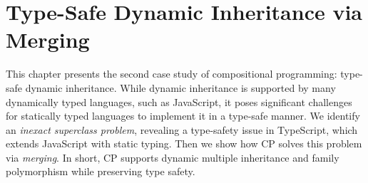 \chapter{Type-Safe Dynamic Inheritance via Merging} \label{ch:inheritance}

This chapter presents the second case study of compositional programming:
type-safe dynamic inheritance. While dynamic inheritance is supported by many
dynamically typed languages, such as JavaScript, it poses significant challenges
for statically typed languages to implement it in a type-safe manner. We
identify an \emph{inexact superclass problem}, revealing a type-safety issue in
TypeScript, which extends JavaScript with static typing. Then we show how CP
solves this problem via \emph{merging}. In short, CP supports dynamic multiple
inheritance and family polymorphism while preserving type safety.




